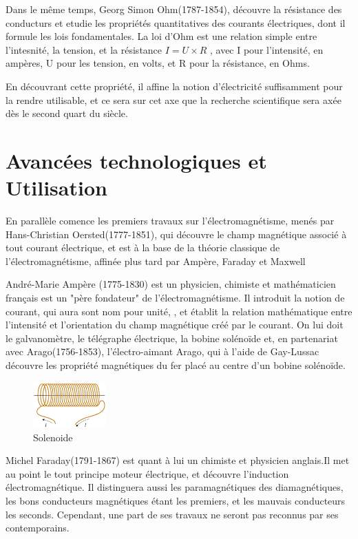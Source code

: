 \documentclass[12pt]{report}
\begin{document}
Dans le même temps, Georg Simon Ohm(1787-1854), découvre la résistance des conducturs et etudie les propriétés quantitatives des courants électriques, dont il formule les lois fondamentales. La loi d'Ohm est une relation simple entre l'intesnité, la tension, et la résistance \( I = U \times R \) , avec I pour l'intensité, en ampères, U pour les tension, en volts, et R pour la résistance, en Ohms.
    
    En découvrant cette propriété, il affine la notion d'électricité suffisamment pour la rendre utilisable, et ce sera sur cet axe que la recherche scientifique sera axée dès le second quart du siècle.
\section{Avancées technologiques et Utilisation}
En parallèle comence les premiers travaux sur l'électromagnétisme, menés par Hans-Christian Oersted(1777-1851), qui découvre le champ magnétique associé à tout courant électrique, et est à la base de la théorie classique de l'électromagnétisme, affinée plus tard par Ampère, Faraday et Maxwell


André-Marie Ampère (1775-1830) est un physicien, chimiste et mathématicien français est un "père fondateur" de l'électromagnétisme. Il introduit la notion de courant, qui aura sont nom pour unité, , et établit la relation mathématique entre l'intensité et l'orientation du champ magnétique créé par le courant. On lui doit le galvanomètre, le télégraphe électrique, la bobine solénoïde et, en partenariat avec Arago(1756-1853), l'électro-aimant
Arago, qui à l'aide de Gay-Lussac découvre les propriété magnétiques du fer placé au centre d'un bobine solénoïde.

\begin{figure}
  \begin{center}
    \includegraphics[width=0.25\textwidth]{solenoide}
  \end{center}
  \caption{Solenoide}
\end{figure}
Michel Faraday(1791-1867) est quant à lui un chimiste et physicien anglais.Il met au point le tout principe moteur électrique, et découvre l'induction électromagnétique. Il distinguera aussi les paramagnétiques des diamagnétiques, les bons conducteurs magnétiques étant les premiers, et les mauvais conducteurs les seconds.
Cependant, une part de ses travaux ne seront pas reconnus par ses contemporains.
\end{document}
